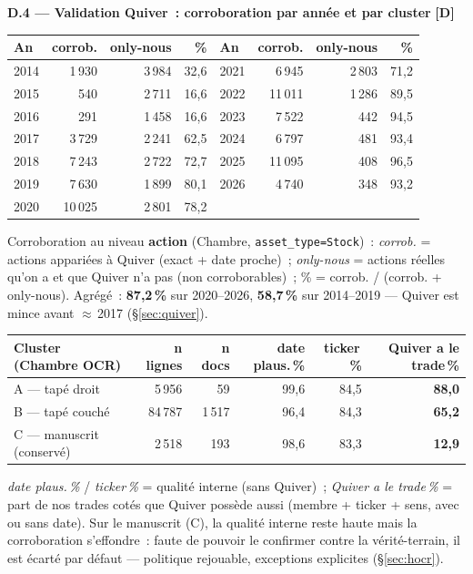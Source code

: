 \documentclass[11pt,a4paper]{article}
\newcommand{\co}[1]{\texttt{\small #1}}
\begin{document}
\textbf{D.4 — Validation Quiver~: corroboration par année et par cluster} \hfill {\footnotesize\textbf{[D]}}
\begin{center}\small
\begin{tabular}{l rrr @{\hspace{2.6em}} l rrr}
\toprule
\bfseries An & corrob. & only-nous & \bfseries \% & \bfseries An & corrob. & only-nous & \bfseries \% \\
\midrule
2014 & 1\,930 & 3\,984 & 32,6 & 2021 & 6\,945 & 2\,803 & 71,2 \\
2015 & 540 & 2\,711 & 16,6 & 2022 & 11\,011 & 1\,286 & 89,5 \\
2016 & 291 & 1\,458 & 16,6 & 2023 & 7\,522 & 442 & 94,5 \\
2017 & 3\,729 & 2\,241 & 62,5 & 2024 & 6\,797 & 481 & 93,4 \\
2018 & 7\,243 & 2\,722 & 72,7 & 2025 & 11\,095 & 408 & 96,5 \\
2019 & 7\,630 & 1\,899 & 80,1 & 2026 & 4\,740 & 348 & 93,2 \\
2020 & 10\,025 & 2\,801 & 78,2 & & & & \\
\bottomrule
\end{tabular}
\end{center}
{\footnotesize Corroboration au niveau \textbf{action} (Chambre, \co{asset_type=Stock})~: \emph{corrob.} =
actions appariées à Quiver (exact + date proche)~; \emph{only-nous} = actions réelles qu'on a et que Quiver
n'a pas (non corroborables)~; \% = corrob. / (corrob. + only-nous). Agrégé~: \textbf{87,2\,\%} sur
2020--2026, \textbf{58,7\,\%} sur 2014--2019 — Quiver est mince avant $\approx$\,2017 (\S{}\ref{sec:quiver}).}

\begin{center}\small
\begin{tabular}{l rr rrr}
\toprule
\bfseries Cluster (Chambre OCR) & n lignes & n docs & date plaus.\,\% & ticker\,\% & Quiver a le trade\,\%\\
\midrule
A — tapé droit & 5\,956 & 59 & 99,6 & 84,5 & \textbf{88,0} \\
B — tapé couché & 84\,787 & 1\,517 & 96,4 & 84,3 & \textbf{65,2} \\
C — manuscrit (conservé) & 2\,518 & 193 & 98,6 & 83,3 & \textbf{12,9} \\
\bottomrule
\end{tabular}
\end{center}
{\footnotesize \emph{date plaus.\,\%} / \emph{ticker\,\%} = qualité interne (sans Quiver)~; \emph{Quiver a
le trade\,\%} = part de nos trades cotés que Quiver possède aussi (membre + ticker + sens, avec ou sans
date). Sur le manuscrit (C), la qualité interne reste haute mais la corroboration s'effondre~: faute de
pouvoir le confirmer contre la vérité-terrain, il est écarté par défaut — politique rejouable, exceptions
explicites (\S{}\ref{sec:hocr}).}
\end{document}
